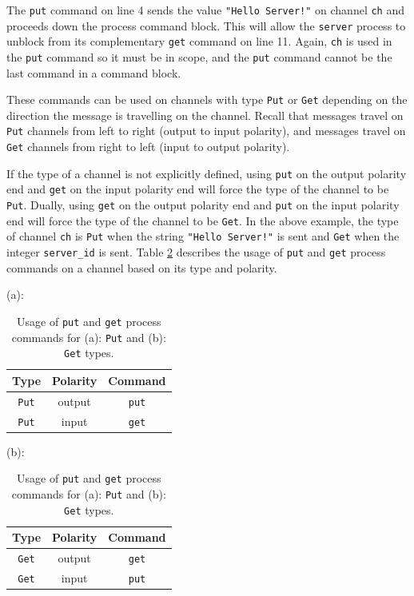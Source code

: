 \documentclass[11pt]{article}
\begin{document}
The \lstinline$put$ command on line 4 sends the value \lstinline$"Hello Server!"$ on channel \lstinline$ch$ and proceeds down the process command block. 
This will allow the \lstinline$server$ process to unblock from its complementary \lstinline$get$ command on line 11.
Again, \lstinline$ch$ is used in the \lstinline$put$ command so it must be in scope, and the \lstinline$put$ command cannot be the last command in a command block. 

These commands can be used on channels with type \lstinline$Put$ or \lstinline$Get$ depending on the direction the message is travelling on the channel.
Recall that messages travel on \lstinline$Put$ channels from left to right (output to input polarity), and messages travel on \lstinline$Get$ channels from right to left (input to output polarity).

If the type of a channel is not explicitly defined, using \lstinline$put$ on the output polarity end and \lstinline$get$ on the input polarity end will force the type of the channel to be \lstinline$Put$.
Dually, using \lstinline$get$ on the output polarity end and \lstinline$put$ on the input polarity end will force the type of the channel to be \lstinline$Get$.
In the above example, the type of channel \lstinline$ch$ is \lstinline$Put$ when the string \lstinline$"Hello Server!"$ is sent and \lstinline$Get$ when the integer \lstinline$server_id$ is sent.
Table \ref{Table: Usage of get and put process commands} describes the usage of \lstinline$put$ and \lstinline$get$ process commands on a channel based on its type and polarity.
\begin{table}[h]
\begin{center}
	(a): \quad \begin{tabular}{  c | c || c }
		  Type & Polarity & Command \\
		 \hline
		 \hline      
		 \lstinline$Put$ & output  & \lstinline$put$ \\
		 \hline
		 \lstinline$Put$ & input  & \lstinline$get$ 
	\end{tabular}
	\quad \quad 
	(b): \quad \begin{tabular}{  c | c || c }
		 Type & Polarity & Command \\
		 \hline
		 \hline      
		 \lstinline$Get$ & output  & \lstinline$get$ \\
		 \hline
		 \lstinline$Get$ & input  & \lstinline$put$ 
	\end{tabular}
	\caption{Usage of \lstinline$put$ and \lstinline$get$ process commands for (a): \lstinline$Put$ and (b): \lstinline$Get$ types.}
	\label{Table: Usage of get and put process commands}
\end{center}
\end{table}
\end{document}
